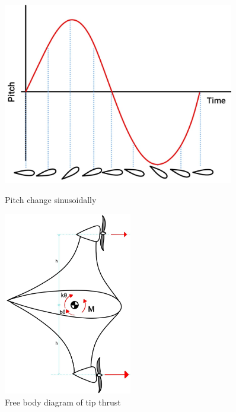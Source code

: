             \begin{figure}[h]
                \centering
                \begin{minipage}{0.45\textwidth}
                    \centering
                    \includegraphics*[width =0.9\textwidth]{figs/Model/Pitch/Pitch_variation.jpg}
                    \caption{Pitch change sinusoidally}
                    \label{fig: pitch_change}
                \end{minipage}\hfill
                \begin{minipage}{0.45\textwidth}
                    \centering
                    \includegraphics*[width = 0.5\textwidth]{figs/Model/Pitch/Free_body_diagram_spring.jpg}
                    \caption{Free body diagram of tip thrust }
                    \label{fig: free_body_diagram}
                \end{minipage}
            \end{figure} 
